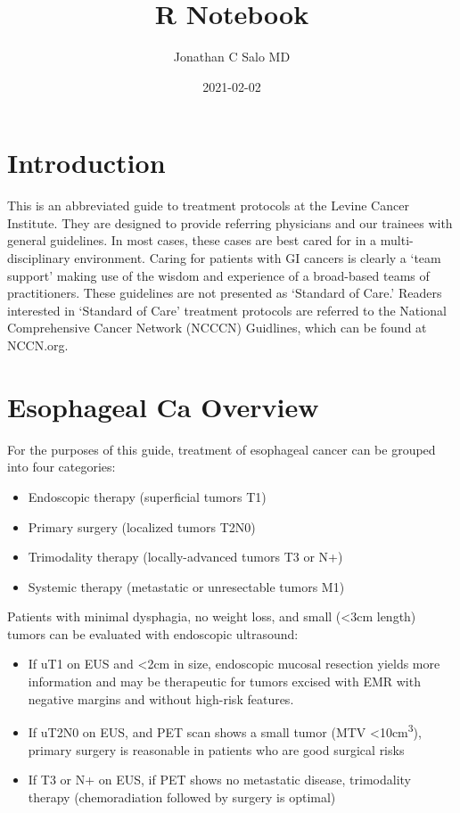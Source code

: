 \documentclass[
]{book}
\title{R Notebook}
\author{Jonathan C Salo MD}
\date{2021-02-02}
\providecommand{\tightlist}{%
  \setlength{\itemsep}{0pt}\setlength{\parskip}{0pt}}
\begin{document}
\maketitle

{
\setcounter{tocdepth}{1}
\tableofcontents
}
\hypertarget{introduction}{%
\chapter*{Introduction}\label{introduction}}

This is an abbreviated guide to treatment protocols at the Levine Cancer Institute. They are designed to provide referring physicians and our trainees with general guidelines. In most cases, these cases are best cared for in a multi-disciplinary environment. Caring for patients with GI cancers is clearly a `team support' making use of the wisdom and experience of a broad-based teams of practitioners. These guidelines are not presented as `Standard of Care.' Readers interested in `Standard of Care' treatment protocols are referred to the National Comprehensive Cancer Network (NCCCN) Guidlines, which can be found at NCCN.org.

\hypertarget{EsoIntro}{%
\chapter{Esophageal Ca Overview}\label{EsoIntro}}

For the purposes of this guide, treatment of esophageal cancer can be grouped into four categories:

\begin{itemize}
\tightlist
\item
  Endoscopic therapy (superficial tumors T1)
\item
  Primary surgery (localized tumors T2N0)
\item
  Trimodality therapy (locally-advanced tumors T3 or N+)
\item
  Systemic therapy (metastatic or unresectable tumors M1)
\end{itemize}

Patients with minimal dysphagia, no weight loss, and small (\textless3cm length) tumors can be evaluated with endoscopic ultrasound:

\begin{itemize}
\tightlist
\item
  If uT1 on EUS and \textless2cm in size, endoscopic mucosal resection yields more information and may be therapeutic for tumors excised with EMR with negative margins and without high-risk features.
\item
  If uT2N0 on EUS, and PET scan shows a small tumor (MTV \textless10cm\textsuperscript{3}), primary surgery is reasonable in patients who are good surgical risks
\item
  If T3 or N+ on EUS, if PET shows no metastatic disease, trimodality therapy (chemoradiation followed by surgery is optimal)
\end{itemize}
\end{document}
